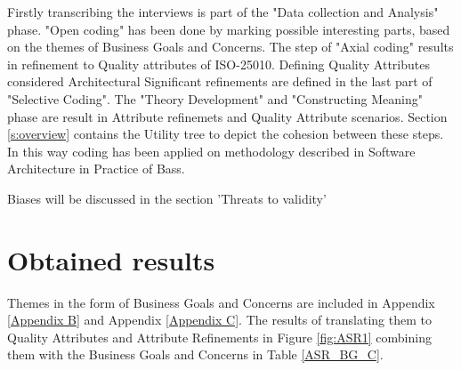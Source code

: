 Firstly transcribing the interviews is part of the "Data collection and Analysis" phase. "Open coding" has been done by marking possible interesting parts, based on the themes of Business Goals and Concerns. The step of "Axial coding" results in refinement to Quality attributes of ISO-25010. Defining Quality Attributes considered Architectural Significant refinements are defined in the last part of "Selective Coding". The "Theory Development" and "Constructing Meaning" phase are result in Attribute refinemets and Quality Attribute scenarios. Section \ref{s:overview} contains the Utility tree to depict the cohesion between these steps. In this way coding has been applied on methodology described in Software Architecture in Practice of Bass\etal \cite{Bass2015SoftwareAI}.

Biases will be discussed in the section 'Threats to validity'

\section{Obtained results}
Themes in the form of Business Goals and Concerns are included in Appendix \ref{Appendix B} and Appendix \ref{Appendix C}. The results of translating them to Quality Attributes and Attribute Refinements in Figure \ref{fig:ASR1} combining them with the Business Goals and Concerns in Table \ref{ASR_BG_C}.




